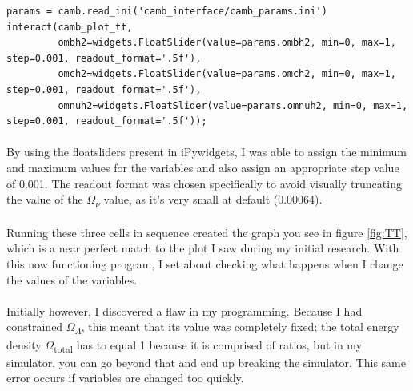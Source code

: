 \documentclass[twoside, fontsize=12pt,
     bibliography=totoc, %
     listof=totoc, %
     index=totoc, %
     onehalfspacing %
]{_MScDiss2017_cls}
\begin{document}


\begin{lstfloat}
\begin{lstlisting}[caption={Creating the first plot}, captionpos=b]
params = camb.read_ini('camb_interface/camb_params.ini')
interact(camb_plot_tt,
         ombh2=widgets.FloatSlider(value=params.ombh2, min=0, max=1, step=0.001, readout_format='.5f'),
         omch2=widgets.FloatSlider(value=params.omch2, min=0, max=1, step=0.001, readout_format='.5f'),
         omnuh2=widgets.FloatSlider(value=params.omnuh2, min=0, max=1, step=0.001, readout_format='.5f'));
\end{lstlisting}
\end{lstfloat}

\paragraph{}

By using the floatsliders present in iPywidgets, I was able to assign the minimum and maximum values for the variables and also assign an appropriate step value of 0.001. The readout format was chosen specifically to avoid visually truncating the value of the $\Omega$\textsubscript{$\nu$} value, as it's very small at default (0.00064).

\paragraph{}

Running these three cells in sequence created the graph you see in figure \ref{fig:TT}, which is a near perfect match to the plot I saw during my initial research. With this now functioning program, I set about checking what happens when I change the values of the variables.

\paragraph{}

Initially however, I discovered a flaw in my programming. Because I had constrained $\Omega$\textsubscript{$\Lambda$}, this meant that its value was completely fixed; the total energy density $\Omega$\textsubscript{total} has to equal 1 because it is comprised of ratios, but in my simulator, you can go beyond that and end up breaking the simulator. This same error occurs if variables are changed too quickly.
\end{document}

